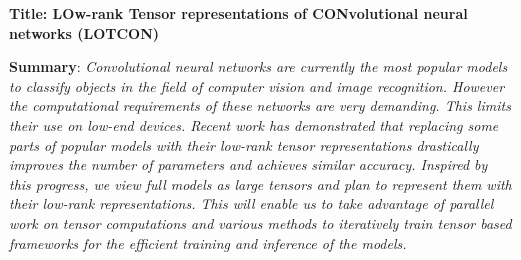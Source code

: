 
\usepackage{xspace}




%

\renewcommand{\prname}{LOTCON\xspace}
\renewcommand{\piname}{PI: Suraj KUMAR (LIP, ENS \& Inria Lyon)}

\noindent \textbf{Title: {LOw-rank Tensor representations of CONvolutional neural networks (LOTCON)}}



\bigskip

\noindent \textbf{Summary}: \emph{Convolutional neural networks are currently the most popular models to classify objects in the field of computer vision and image recognition. However the computational requirements of these networks are very demanding. This limits their use on low-end devices. Recent work has demonstrated that replacing some parts of popular models with their low-rank tensor representations drastically improves the number of parameters and achieves similar accuracy. Inspired by this progress, we view full models as large tensors and plan to represent them with their low-rank representations. This will enable us to take advantage of parallel work on tensor computations and various methods to iteratively train tensor based frameworks for the efficient training and inference of the models.}

